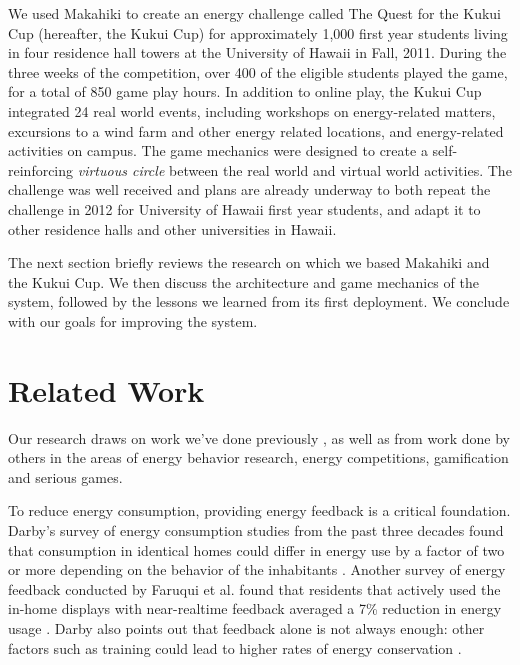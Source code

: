 \documentclass{acm_proc_article-sp}
\begin{document}
We used Makahiki to create an energy challenge called The Quest for the Kukui
Cup (hereafter, the Kukui Cup) for approximately 1,000 first year students
living in four residence hall towers at the University of Hawaii in Fall, 2011.
During the three weeks of the competition, over 400 of the eligible students
played the game, for a total of 850 game play hours.  In addition to online
play, the Kukui Cup integrated 24 real world events, including workshops on
energy-related matters, excursions to a wind farm and other energy related
locations, and energy-related activities on campus. The game mechanics were
designed to create a self-reinforcing \emph{virtuous circle} between the real
world and virtual world activities.  The challenge was well received and plans
are already underway to both repeat the challenge in 2012 for University of
Hawaii first year students, and adapt it to other residence halls and other
universities in Hawaii.

The next section briefly reviews the research on which we based Makahiki and
the Kukui Cup. We then discuss the architecture and game mechanics of the
system, followed by the lessons we learned from its first deployment. We
conclude with our goals for improving the system.

\section{Related Work}
Our research draws on work we've done previously
 \cite{csdl2-11-03,csdl2-10-07,csdl2-11-02}, as well as from
work done by others in the areas of energy behavior research, energy 
competitions, gamification and serious games. 

To reduce energy consumption, providing energy feedback is a critical
foundation. Darby's survey of energy consumption studies from the past three
decades found  that consumption in identical homes could differ in energy use
by a factor of two or more depending on the behavior of the inhabitants
\cite{darby-review-2006}. Another survey of energy feedback conducted by
Faruqui et al. found that residents that actively used the in-home displays
with near-realtime feedback averaged a 7\% reduction in energy usage
\cite{Faruqui09}. Darby also points out that feedback alone is not always
enough: other factors such as training could lead to higher rates of energy
conservation \cite{darby-2000-making-it-obvious}.
\end{document}
